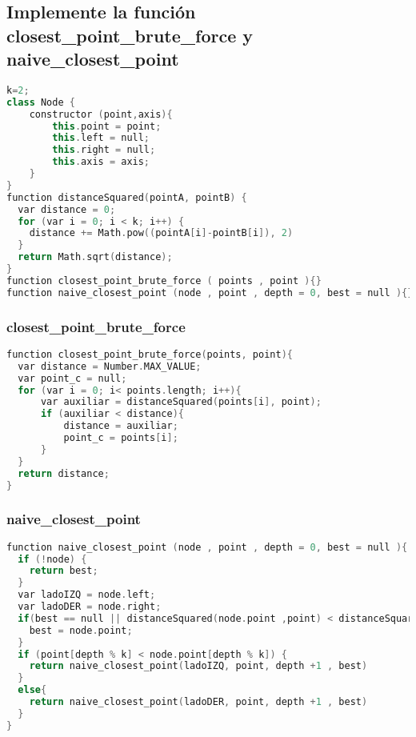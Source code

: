 \subsection{Implemente la función closest\_point\_brute\_force y naive\_closest\_point}

\begin{lstlisting}[language=C++,
                   directivestyle={\color{black}}
                   emph={int,char,double,float,unsigned},
                   emphstyle={\color{blue}}
                  ]
k=2;
class Node {
	constructor (point,axis){
		this.point = point;
		this.left = null;
		this.right = null;
        this.axis = axis;
	}
}
function distanceSquared(pointA, pointB) {
  var distance = 0;
  for (var i = 0; i < k; i++) {
    distance += Math.pow((pointA[i]-pointB[i]), 2)
  }
  return Math.sqrt(distance);
}
function closest_point_brute_force ( points , point ){}
function naive_closest_point (node , point , depth = 0, best = null ){}
\end{lstlisting}

\subsubsection{closest\_point\_brute\_force}
\begin{lstlisting}[language=C++,
                   directivestyle={\color{black}}
                   emph={int,char,double,float,unsigned},
                   emphstyle={\color{blue}}
                  ]
function closest_point_brute_force(points, point){
  var distance = Number.MAX_VALUE;
  var point_c = null;
  for (var i = 0; i< points.length; i++){
      var auxiliar = distanceSquared(points[i], point);
      if (auxiliar < distance){
          distance = auxiliar;
          point_c = points[i];
      }
  }
  return distance;
}
\end{lstlisting}

\subsubsection{naive\_closest\_point}
\begin{lstlisting}[language=C++,
                   directivestyle={\color{black}}
                   emph={int,char,double,float,unsigned},
                   emphstyle={\color{blue}}
                  ]
function naive_closest_point (node , point , depth = 0, best = null ){
  if (!node) {
    return best;
  }
  var ladoIZQ = node.left;
  var ladoDER = node.right;
  if(best == null || distanceSquared(node.point ,point) < distanceSquared(best,point)){
    best = node.point;
  }
  if (point[depth % k] < node.point[depth % k]) {
    return naive_closest_point(ladoIZQ, point, depth +1 , best)
  }
  else{
    return naive_closest_point(ladoDER, point, depth +1 , best)  
  }
}
\end{lstlisting}